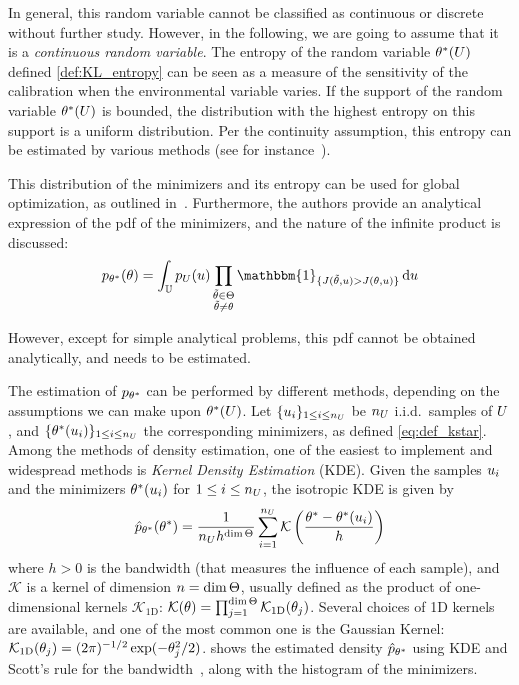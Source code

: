 \documentclass[../../Main_ManuscritThese.tex]{subfiles}
\begin{document}
In general, this random variable cannot be classified as continuous or
discrete without further study. However, in the following, we are
going to assume that it is a \emph{continuous random variable}.  The
entropy of the random variable $\theta^*(U)$ defined
\cref{def:KL_entropy} can be seen as a measure of the sensitivity of
the calibration when the environmental variable varies. If the support
of the random variable $\theta^*(U)$ is bounded, the distribution with
the highest entropy on this support is a uniform distribution.  Per
the continuity assumption, this entropy can be estimated by various
methods (see for instance~\cite{beirlant_nonparametric_1997}).


This distribution of the minimizers and its entropy can be used for
global optimization, as outlined
in~\cite{hennig_entropy_2011}. Furthermore, the authors provide an
analytical expression of the pdf of the minimizers, and the nature of
the infinite product is discussed:
\begin{equation}
  p_{\KK^*}(\kk) = \int_{\Uspace} p_{\UU}(\uu)\prod_{\substack{\tilde{\kk}\in \Kspace\\\tilde{\kk}\neq \kk}} \mathbbm{1}_{\{J(\tilde{\kk},\uu) > J(\kk, \uu)\}}\,\mathrm{d}\uu
\end{equation}

However, except for simple analytical problems, this pdf cannot be
obtained analytically, and needs to be estimated.

The estimation of $p_{\theta^*}$ can be performed by different methods,
depending on the assumptions we can make upon $\theta^*(U)$. Let
$\{u_i\}_{1\leq i \leq n_{U}}$ be $n_{U}$ i.i.d.\ samples of
$U$, and $\{\theta^*(u_i)\}_{1\leq i \leq n_{U}}$ the corresponding
minimizers, as defined \cref{eq:def_kstar}. Among the methods of
density estimation, one of the easiest to implement and widespread
methods is \emph{Kernel Density Estimation} (KDE).  Given the samples
$u_i$ and the minimizers $\theta^*(u_i)$ for $1\leq i \leq n_{U}$,
the isotropic KDE is given by
\begin{equation}
  \hat{p}_{\theta^*}(\theta^*) = \frac{1}{n_{U} h^{\dim \Theta}} \sum_{i=1}^{n_{U}} \mathcal{K}\left(\frac{\theta^* - \theta^*(u_i)}{h}\right)
\end{equation}
where $h>0$ is the bandwidth (that measures the influence of each
sample), and $\mathcal{K}$ is a kernel of dimension $n=\dim \Theta$,
usually defined as the product of one-dimensional kernels
$\mathcal{K}_{1\mathrm{D}}$:
$\mathcal{K}(\theta) = \prod_{j=1}^{\dim
  \Theta}\mathcal{K}_{1\mathrm{D}}(\theta_j)$. Several choices of 1D
kernels are available, and one of the most common one is the Gaussian
Kernel:
$\mathcal{K}_{1\mathrm{D}}(\theta_j) = (2\pi)^{-1/2}\exp(-\theta_j^2
/2)$.  shows the estimated density
$\hat{p}_{\theta^*}$ using KDE and Scott's rule for the
bandwidth~\cite{scott_optimal_1979}, along with the histogram of the
minimizers.
\end{document}
